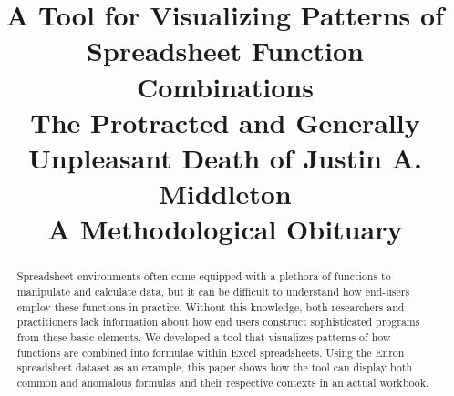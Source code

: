 \documentclass[conference]{IEEEtran}
\begin{document}
\title{A Tool for Visualizing Patterns of Spreadsheet Function Combinations \\ \large The Protracted and Generally Unpleasant Death of Justin A. Middleton\\ A Methodological Obituary}


\author{
}






\maketitle

\begin{abstract}
Spreadsheet environments often come equipped with a plethora of functions to manipulate and calculate data, but it can be difficult to understand how end-users employ these functions in practice. Without this knowledge, both researchers and practitioners lack information about how end users construct sophisticated programs from these basic elements. We developed a tool that visualizes patterns of how functions are combined into formulae within Excel spreadsheets. Using the Enron spreadsheet dataset as an example, this paper shows how the tool can display both common and anomalous formulas and their respective contexts in an actual workbook.
\end{abstract}





%
\IEEEpeerreviewmaketitle
\end{document}
